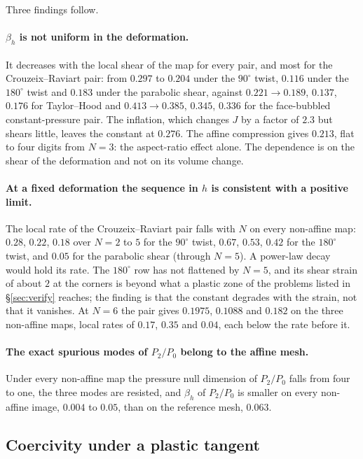 \documentclass[11pt]{article}
\theoremstyle{definition}
\theoremstyle{plain}
\begin{document}
Three findings follow.

\paragraph{$\beta_h$ is not uniform in the deformation.} It decreases with
the local shear of the map for every pair, and most for the
Crouzeix--Raviart pair: from $0.297$ to $0.204$ under the $90^\circ$ twist,
$0.116$ under the $180^\circ$ twist and $0.183$ under the parabolic shear,
against $0.221 \to 0.189$, $0.137$, $0.176$ for Taylor--Hood and
$0.413 \to 0.385$, $0.345$, $0.336$ for the face-bubbled constant-pressure
pair. The inflation, which changes $J$ by a factor of $2.3$ but shears
little, leaves the constant at $0.276$. The affine compression gives $0.213$,
flat to four digits from $N = 3$: the aspect-ratio effect alone.
The dependence is on the shear of the deformation and not on its volume
change.

\paragraph{At a fixed deformation the sequence in $h$ is consistent with a
positive limit.} The local rate of the Crouzeix--Raviart pair falls with
$N$ on every non-affine map: $0.28$, $0.22$, $0.18$ over $N = 2$ to $5$ for
the $90^\circ$ twist, $0.67$, $0.53$, $0.42$ for the $180^\circ$ twist, and
$0.05$ for the parabolic shear (through $N = 5$). A power-law decay would hold its rate. The
$180^\circ$ row has not flattened by $N = 5$, and its shear strain of about
$2$ at the corners is beyond what a plastic zone of the problems listed in
\S\ref{sec:verify} reaches; the finding is that the constant degrades with the strain, not that
it vanishes. At $N = 6$ the pair gives $0.1975$, $0.1088$ and $0.182$ on
the three non-affine maps, local rates of $0.17$, $0.35$ and $0.04$, each
below the rate before it.

\paragraph{The exact spurious modes of $P_2/P_0$ belong to the affine mesh.}
Under every non-affine map the pressure null dimension of $P_2/P_0$ falls
from four to one, the three modes are resisted, and $\beta_h$ of $P_2/P_0$
is smaller on every non-affine image, $0.004$ to $0.05$, than on the reference
mesh, $0.063$.

\subsection{Coercivity under a plastic tangent}
\label{sec:plastic}
\end{document}
